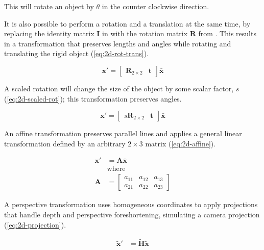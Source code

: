 This will rotate an object by $\theta$ in the counter clockwise direction. 

It is also possible to perform a rotation and a translation at the same time, by replacing the identity matrix $\mathbf{I}$ in  with the rotation matrix $\mathbf{R}$ from .
This results in a transformation that preserves lengths and angles while rotating and translating the rigid object (\cref{eq:2d-rot-trans}).

\begin{equation}
    \mathbf{x}' = \begin{bmatrix}
        \mathbf{R}_{2 \times 2} & \mathbf{t}
    \end{bmatrix} \bar{\mathbf{x}}
    \label{eq:2d-rot-trans}
\end{equation}


A scaled rotation will change the size of the object by some scalar factor, $s$ (\cref{eq:2d-scaled-rot}); this transformation preserves angles.

\begin{equation}
    \mathbf{x}' = \begin{bmatrix}
        s\mathbf{R}_{2 \times 2} & \mathbf{t}
    \end{bmatrix}\bar{\mathbf{x}}
    \label{eq:2d-scaled-rot}
\end{equation}

An affine transformation preserves parallel lines and applies a general linear transformation defined by an arbitrary $2 \times 3$ matrix (\cref{eq:2d-affine}).

\begin{equation}
    \begin{aligned}
        \mathbf{x}' &= \mathbf{A\bar{x}}\\
        &\text{where}\\
        \mathbf{A} &= \begin{bmatrix}
            a_{11} & a_{12} & a_{13} \\ a_{21} & a_{22} & a_{23}
        \end{bmatrix}
    \end{aligned}
    \label{eq:2d-affine}
\end{equation}

A perspective transformation uses homogeneous coordinates to apply projections that handle depth and perspective foreshortening, simulating a camera projection (\cref{eq:2d-projection}).

\begin{equation}
    \begin{aligned}
        \tilde{\mathbf{x}}' &= \tilde{\mathbf{H}}\tilde{\mathbf{x}}\\
    \end{aligned}
    \label{eq:2d-projection}
\end{equation}


